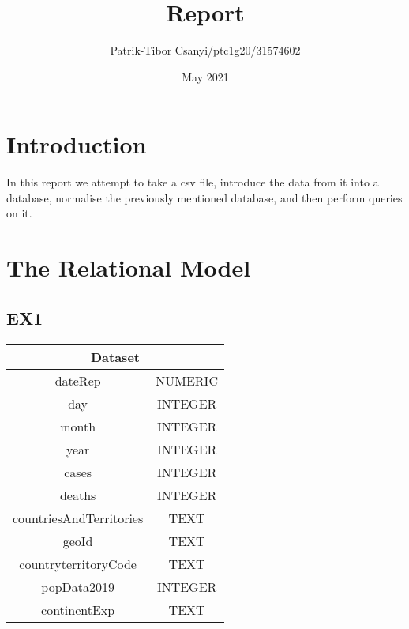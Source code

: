 \documentclass{article}
\title{Report}
\author{Patrik-Tibor Csanyi/ptc1g20/31574602}
\date{May 2021}
\begin{document}
\maketitle

\section{Introduction}
In this report we attempt to take a csv file, introduce the data from it into a database, normalise the previously mentioned database, and then perform queries on it.
\section{The Relational Model}
\subsection{EX1}
\begin{tabular}{|c|c|}
     \hline
     \multicolumn{2}{|c|}{Dataset} \\
     \hline dateRep & NUMERIC \\
     \hline day & INTEGER \\
     \hline month & INTEGER \\
     \hline year & INTEGER \\
     \hline cases & INTEGER \\
     \hline deaths & INTEGER \\
     \hline countriesAndTerritories & TEXT \\
     \hline geoId & TEXT \\
     \hline countryterritoryCode & TEXT \\
     \hline popData2019 & INTEGER \\
     \hline continentExp & TEXT \\
     \hline
\end{tabular}
\end{document}
